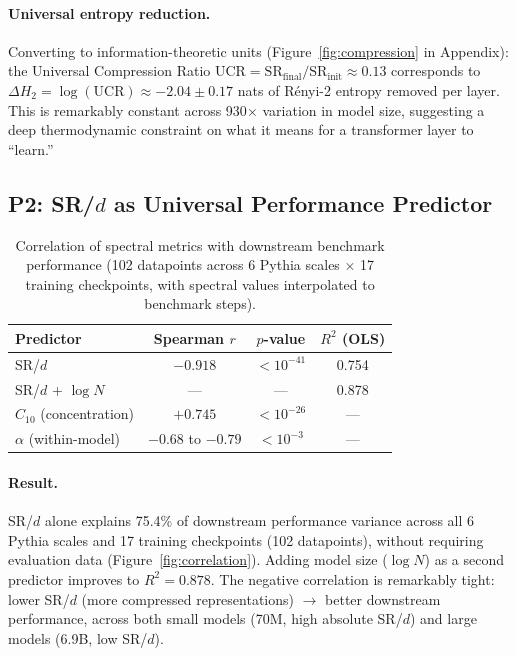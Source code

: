 \paragraph{Universal entropy reduction.} Converting to information-theoretic units (Figure~\ref{fig:compression} in Appendix): the Universal Compression Ratio $\mathrm{UCR} = \mathrm{SR}_{\mathrm{final}} / \mathrm{SR}_{\mathrm{init}} \approx 0.13$ corresponds to $\Delta H_2 = \log(\mathrm{UCR}) \approx -2.04 \pm 0.17$ nats of R\'{e}nyi-2 entropy removed per layer. This is remarkably constant across 930$\times$ variation in model size, suggesting a deep thermodynamic constraint on what it means for a transformer layer to ``learn.''

\subsection{P2: SR/$d$ as Universal Performance Predictor}
\label{sec:predictor}

\begin{table}[t]
\centering
\small
\caption{Correlation of spectral metrics with downstream benchmark performance (102 datapoints across 6 Pythia scales $\times$ 17 training checkpoints, with spectral values interpolated to benchmark steps).}
\label{tab:correlation}
\begin{tabular}{@{}lccc@{}}
\toprule
\textbf{Predictor} & \textbf{Spearman $r$} & $p$\textbf{-value} & \textbf{$R^2$ (OLS)} \\
\midrule
SR/$d$ & $\mathbf{-0.918}$ & $< 10^{-41}$ & 0.754 \\
SR/$d$ + $\log N$ & --- & --- & 0.878 \\
$C_{10}$ (concentration) & $+0.745$ & $< 10^{-26}$ & --- \\
$\alpha$ (within-model) & $-0.68$ to $-0.79$ & $< 10^{-3}$ & --- \\
\bottomrule
\end{tabular}
\end{table}

\paragraph{Result.} SR/$d$ alone explains 75.4\% of downstream performance variance across all 6 Pythia scales and 17 training checkpoints (102 datapoints), without requiring evaluation data (Figure~\ref{fig:correlation}). Adding model size ($\log N$) as a second predictor improves to $R^2 = 0.878$. The negative correlation is remarkably tight: lower SR/$d$ (more compressed representations) $\to$ better downstream performance, across both small models (70M, high absolute SR/$d$) and large models (6.9B, low SR/$d$).

